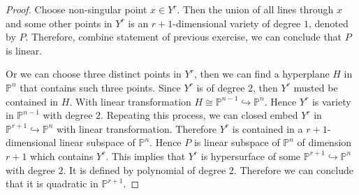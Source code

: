 \documentclass[12pt,a4paper]{article}
\theoremstyle{definition}
\begin{document}
\begin{proof}
	Choose non-singular point $x \in Y^r$. Then the union of all lines  through $x$ and some other points in $Y^r$ is an $r+1$-dimensional variety of degree $1$, denoted by $P$. Therefore, combine statement of previous exercise, we can conclude that $P$ is linear.
	
	Or we can choose three distinct points in $Y^r$, then we can find a hyperplane $H$ in $\mathbb{P}^n$ that contains such three points. Since $Y^r$ is of degree $2$, then $Y^r$ musted be contained in $H$. With linear transformation $H \cong \mathbb{P}^{n-1} \hookrightarrow \mathbb{P}^n$. Hence $Y^r$ is variety in $\mathbb{P}^{n-1}$ with degree $2$. Repeating this process, we can closed embed $Y^r$ in $\mathbb{P}^{r+1} \hookrightarrow \mathbb{P}^n$ with linear transformation. Therefore $Y^r$ is contained in a $r+1$-dimensional linear subspace of $\mathbb{P}^n$.
	Hence $P$ is linear subspace of $\mathbb{P}^n$ of dimension $r+1$ which contains $Y^r$. This implies that $Y^r$ is hypersurface of some $\mathbb{P}^{r+1} \hookrightarrow \mathbb{P}^n$ with degree $2$. It is defined by polynomial of degree $2$. Therefore we can conclude that it is quadratic in $\mathbb{P}^{r+1}$. 
\end{proof}
\end{document}
